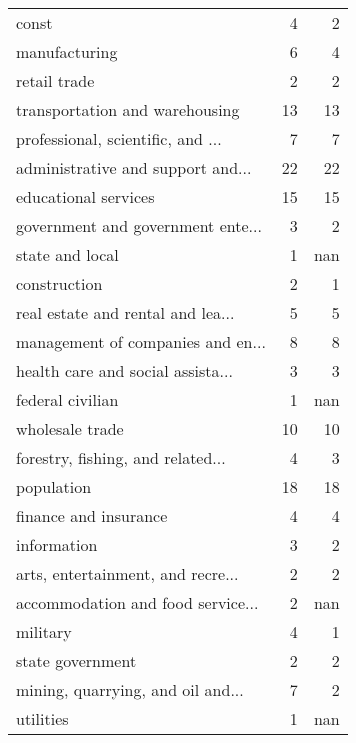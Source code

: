 \begin{tabular}{lrr}
\hline
 const                             &  4 &   2 \\
 manufacturing                     &  6 &   4 \\
 retail trade                      &  2 &   2 \\
 transportation and warehousing    & 13 &  13 \\
 professional, scientific, and ... &  7 &   7 \\
 administrative and support and... & 22 &  22 \\
 educational services              & 15 &  15 \\
 government and government ente... &  3 &   2 \\
 state and local                   &  1 & nan \\
 construction                      &  2 &   1 \\
 real estate and rental and lea... &  5 &   5 \\
 management of companies and en... &  8 &   8 \\
 health care and social assista... &  3 &   3 \\
 federal civilian                  &  1 & nan \\
 wholesale trade                   & 10 &  10 \\
 forestry, fishing, and related... &  4 &   3 \\
 population                        & 18 &  18 \\
 finance and insurance             &  4 &   4 \\
 information                       &  3 &   2 \\
 arts, entertainment, and recre... &  2 &   2 \\
 accommodation and food service... &  2 & nan \\
 military                          &  4 &   1 \\
 state government                  &  2 &   2 \\
 mining, quarrying, and oil and... &  7 &   2 \\
 utilities                         &  1 & nan \\
\hline
\end{tabular}